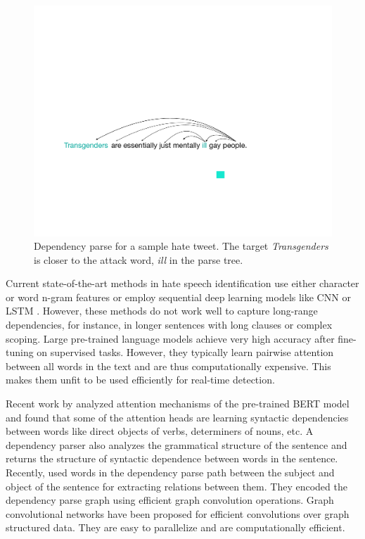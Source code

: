 \begin{figure}[tbh]
    \centering
    \includegraphics[scale=0.6]{figures/sample_key}
    \caption{Dependency parse for a sample hate tweet. The target \emph{Transgenders} is closer to the attack word, \emph{ill} in the parse tree. }
    \label{fig:parser}
\end{figure}


Current state-of-the-art methods in hate speech identification use either character or word n-gram features \cite{waseem-hovy-2016, davidson2017automated} or employ sequential deep learning models like CNN or LSTM \cite{ziqicnn, badjatiya2017deep}. However, these methods do not work well to capture long-range dependencies, for instance, in longer sentences with long clauses or complex scoping. Large pre-trained language models \cite{devlin2019bert} achieve very high accuracy after fine-tuning on supervised tasks. However, they typically learn pairwise attention between all words in the text and are thus computationally expensive. This makes them unfit to be used efficiently for real-time detection.

Recent work by \citet{clark2019does} analyzed attention mechanisms of the pre-trained BERT model and found that some of the attention heads are learning syntactic dependencies between words like direct objects of verbs, determiners of nouns, etc. A dependency parser also analyzes the grammatical structure of the sentence and returns the structure of syntactic dependence between words in the sentence. Recently, \citet{zhang-graph} used words in the dependency parse path between the subject and object of the sentence for extracting relations between them. They encoded the dependency parse graph using efficient graph convolution operations. Graph convolutional networks \cite{kipf2016semi} have been proposed for efficient convolutions over graph structured data. They are easy to parallelize and are computationally efficient.

